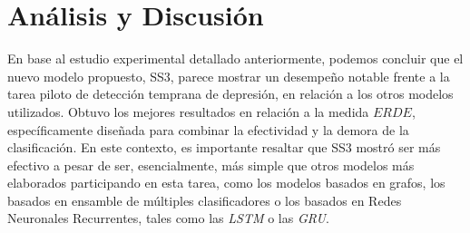 \section{Análisis y Discusión}
\label{sec:analysisAndDiscussion}

En base al estudio experimental detallado anteriormente, podemos concluir que el nuevo modelo propuesto, SS3, parece mostrar un desempeño notable frente a la tarea piloto de detección temprana de depresión, en relación a los otros modelos utilizados. Obtuvo los mejores resultados en relación a la medida $ERDE$, específicamente diseñada para combinar la efectividad y la demora de la clasificación. En este contexto, es importante resaltar que SS3 mostró ser más efectivo a pesar de ser, esencialmente, más simple que otros modelos más elaborados participando en esta tarea, como los modelos basados en grafos, los basados en ensamble de múltiples clasificadores o los basados en Redes Neuronales Recurrentes, tales como las \emph{LSTM} o las \emph{GRU}.

